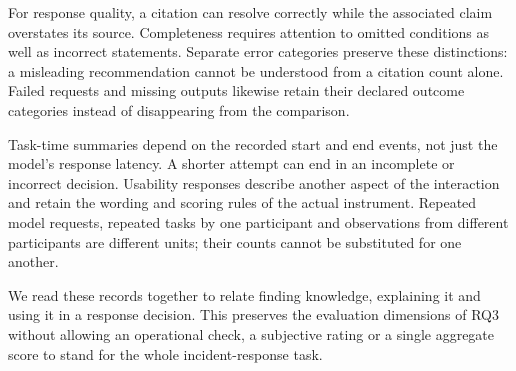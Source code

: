 For response quality, a citation can resolve correctly while the associated claim overstates its source. Completeness requires attention to omitted conditions as well as incorrect statements. Separate error categories preserve these distinctions: a misleading recommendation cannot be understood from a citation count alone. Failed requests and missing outputs likewise retain their declared outcome categories instead of disappearing from the comparison.

Task-time summaries depend on the recorded start and end events, not just the model's response latency. A shorter attempt can end in an incomplete or incorrect decision. Usability responses describe another aspect of the interaction and retain the wording and scoring rules of the actual instrument. Repeated model requests, repeated tasks by one participant and observations from different participants are different units; their counts cannot be substituted for one another.

We read these records together to relate finding knowledge, explaining it and using it in a response decision. This preserves the evaluation dimensions of RQ3 without allowing an operational check, a subjective rating or a single aggregate score to stand for the whole incident-response task.
